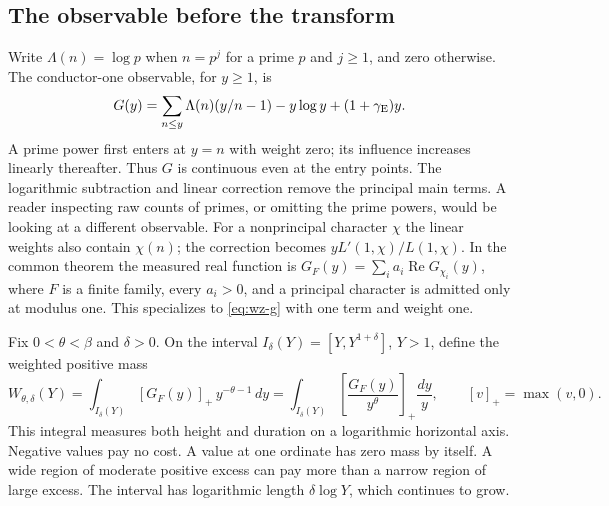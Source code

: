 \documentclass[12pt,letterpaper]{article}
\begin{document}
\subsection{The observable before the transform}
Write \(\Lambda(n)=\log p\) when \(n=p^j\) for a prime \(p\) and \(j\ge1\), and zero otherwise. The conductor-one observable, for \(y\ge1\), is
\begin{equation}
 G(y)=\sum_{n\le y}\Lambda(n)(y/n-1)
                -y\log y+(1+\gamma_{\rm E})y. \label{eq:wz-g}
\end{equation}
A prime power first enters at \(y=n\) with weight zero; its influence increases linearly thereafter. Thus \(G\) is continuous even at the entry points. The logarithmic subtraction and linear correction remove the principal main terms. A reader inspecting raw counts of primes, or omitting the prime powers, would be looking at a different observable. For a nonprincipal character \(\chi\) the linear weights also contain \(\chi(n)\); the correction becomes \(yL'(1,\chi)/L(1,\chi)\). In the common theorem the measured real function is \(G_F(y)=\sum_i a_i\operatorname{Re}G_{\chi_i}(y)\), where \(F\) is a finite family, every \(a_i>0\), and a principal character is admitted only at modulus one. This specializes to \eqref{eq:wz-g} with one term and weight one. 

Fix \(0<\theta<\beta\) and \(\delta>0\). On the interval \(I_\delta(Y)=[Y,Y^{1+\delta}]\), \(Y>1\), define the weighted positive mass
\begin{equation}
 W_{\theta,\delta}(Y)=\int_{I_\delta(Y)}[G_F(y)]_+\, y^{-\theta-1}\,dy
 =\int_{I_\delta(Y)}\left[\frac{G_F(y)}{y^\theta}\right]_+\frac{dy}{y},
 \qquad [v]_+=\max(v,0).                                  \label{eq:wz-mass}
\end{equation}
This integral measures both height and duration on a logarithmic horizontal axis. Negative values pay no cost. A value at one ordinate has zero mass by itself. A wide region of moderate positive excess can pay more than a narrow region of large excess. The interval has logarithmic length \(\delta\log Y\), which continues to grow.
\end{document}
